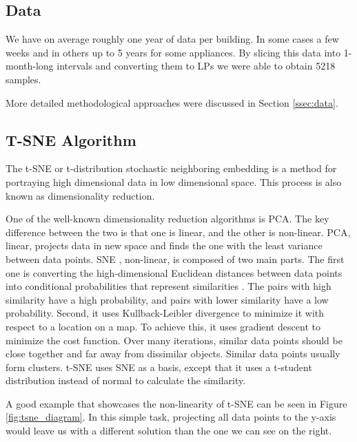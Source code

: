 \subsection{Data}

We have on average roughly one year of data per building. 
In some cases a few weeks and in others up to 5 years for some appliances.
By slicing this data into 1-month-long intervals and converting them to LPs we were able to obtain 5218 samples.

More detailed methodological approaches were discussed in Section \ref{ssec:data}.

\subsection{T-SNE Algorithm}

The t-SNE \cite{tsne2} or t-distribution stochastic neighboring embedding is a method for portraying high dimensional
data in low dimensional space. This process is also known as dimensionality reduction.

One of the well-known dimensionality reduction algorithms is PCA.
The key difference between the two is that one is linear, and the other is non-linear.
PCA, linear, projects data in new space and finds the one with the least variance between data points.
SNE \cite{sne1}, non-linear, is composed of two main parts. The first one is
converting the high-dimensional Euclidean distances between data points into conditional probabilities that represent similarities \cite{sne1}.
The pairs with high similarity have a high probability, and pairs with lower similarity have a low probability.
Second, it uses Kullback-Leibler divergence to minimize it with respect to a location on a map.
To achieve this, it uses gradient descent to minimize the cost function.
Over many iterations, similar data points should be close together and far away from dissimilar objects.
Similar data points usually form clusters.
t-SNE uses SNE as a basis, except that it uses a t-student distribution instead of normal to calculate the similarity.

A good example that showcases the non-linearity of t-SNE can be seen in Figure \ref{fig:tsne_diagram}.
In this simple task, projecting all data points to the y-axis would leave us with a different solution than the one we can see on the right.

